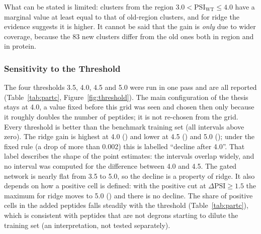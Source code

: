\begin{table}[htbp]
  \centering
  \caption{Pre-registered verdicts on the new clusters. The reference marginal gain of old-region clusters is \nBaseMarginal.}\label{tab:partbverdict}
  
\end{table}

What can be stated is limited: clusters from the region $3.0<\mathrm{PSI}_{\mathrm{WT}}\le4.0$ have a marginal value at least equal
to that of old-region clusters, and for ridge the evidence suggests it is higher. It cannot be said that the gain is
\emph{only} due to wider coverage, because the 83 new clusters differ from the old ones both in region and in protein.

\subsubsection{Sensitivity to the Threshold}\label{sec:res-partc}
The four thresholds 3.5, 4.0, 4.5 and 5.0 were run in one pass and are all reported (Table~\ref{tab:partc},
Figure~\ref{fig:threshold}). The main configuration of the thesis stays at 4.0, a value fixed before this grid was
seen and chosen then only because it roughly doubles the number of peptides; it is not re-chosen from the grid.
Every threshold is better than the benchmark training set (all intervals above zero). The ridge gain is highest at 4.0
(\nCFourD) and lower at 4.5 (\nCFourFiveD) and 5.0 (\nCFiveD); under the fixed rule (a drop of more than 0.002) this
is labelled ``decline after 4.0''. That label describes the shape of the point estimates: the intervals overlap
widely, and no interval was computed for the difference between 4.0 and 4.5. The gated network is nearly flat
from 3.5 to 5.0, so the decline is a property of ridge. It also depends on how a positive cell is defined: with
the positive cut at $\Delta\mathrm{PSI}\ge1.5$ the maximum for ridge moves to 5.0 (\nCAtOneFiveFive) and there is no decline.
The share of positive cells in the added peptides falls steadily with the threshold (Table~\ref{tab:partc}),
which is consistent with peptides that are not degrons starting to dilute the training set (an interpretation, not tested separately).

\begin{table}[htbp]
  \centering
  \caption{Added data and gains for each degron threshold (cov80, positive cut $\Delta\mathrm{PSI}\ge1$)}\label{tab:partc}
  
\end{table}

